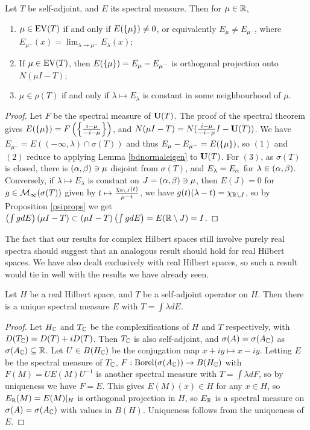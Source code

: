 \documentclass[10pt]{amsart}
\begin{document}
\begin{theorem}\label{eigenvaldecomp}
    Let $T$ be self-adjoint, and $E$ its spectral measure. Then for $\mu \in \mathbb{R}$,
    \begin{enumerate}
        \item $\mu \in \operatorname{EV}(T)$ if and only if $E(\left\{  \mu  \right\}) \neq 0$, or equivalently $E_\mu \neq E_{\mu^-}$, where $E_{\mu^-}(x) = \lim_{\lambda \to \mu^-}E_\lambda(x)$;
        \item If $\mu \in \operatorname{EV}(T)$, then $E(\left\{  \mu  \right\}) = E_\mu - E_{\mu^-}$ is orthogonal projection onto $N(\mu I - T)$;
        \item $\mu \in \rho(T)$ if and only if $\lambda \mapsto E_\lambda$ is constant in some neighbourhood of $\mu$.
    \end{enumerate}
\end{theorem}
\begin{proof}
    Let $F$ be the spectral measure of $\mathbf{U}(T)$. The proof of the spectral theorem gives $E(\left\{  \mu  \right\}) = F\left(  \left\{  \frac{i - \mu}{-i - \mu}  \right\}  \right)$, and $N(\mu I - T) = N(\frac{i - \mu}{-i - \mu}I - \mathbf{U}(T))$. We have $E_{\mu^-} = E((-\infty, \lambda) \cap \sigma(T))$ and thus $E_{\mu} - E_{\mu^-} = E(\left\{  \mu  \right\})$, so $(1)$ and $(2)$ reduce to applying Lemma \ref{bdnormaleigen} to $\mathbf{U}(T)$. For $(3)$, as $\sigma(T)$ is closed, there is $(\alpha, \beta) \ni \mu$ disjoint from $\sigma(T)$, and $E_\lambda = E_\alpha$ for $\lambda \in (\alpha, \beta)$. Conversely, if $\lambda \mapsto E_\lambda$ is constant on $J = (\alpha, \beta) \ni \mu$, then $E(J) = 0$ for $g \in \mathcal{M}_\infty(\sigma(T))$ given by $t \mapsto \frac{\chi_{\mathbb{R} \setminus J}(t)}{\mu - t}$, we have $g(t)(\lambda - t) = \chi_{\mathbb{R} \setminus J}$, so by Proposition \ref{psiprops} we get $\left(  \int g dE  \right)(\mu I - T) \subset (\mu I - T)\left(  \int g dE  \right) = E(\mathbb{R} \setminus J) = I$.
\end{proof}
The fact that our results for complex Hilbert spaces still involve purely real spectra should suggest that an analogous result should hold for real Hilbert spaces. We have also dealt exclusively with real Hilbert spaces, so such a result would tie in well with the results we have already seen.
\begin{theorem}
    Let $H$ be a real Hilbert space, and $T$ be a self-adjoint operator on $H$. Then there is a unique spectral measure $E$ with $T = \int \lambda dE$.
\end{theorem}
\begin{proof}
    Let $H_{\mathbb{C}}$ and $T_{\mathbb{C}}$ be the complexifications of $H$ and $T$ respectively, with $D(T_{\mathbb{C}}) = D(T) + iD(T)$. Then $T_{\mathbb{C}}$ is also self-adjoint, and $\sigma(A) = \sigma(A_{\mathbb{C}})$ as $\sigma(A_{\mathbb{C}}) \subseteq \mathbb{R}$. Let $U \in B(H_{\mathbb{C}})$ be the conjugation map $x + iy \mapsto x - iy$. Letting $E$ be the spectral measure of $T_{\mathbb{C}}$, $F : \operatorname{Borel}(\sigma(A_{\mathbb{C}})) \to B(H_{\mathbb{C}})$ with $F(M) = UE(M)U^{-1}$ is another spectral measure with $T = \int \lambda dF$, so by uniqueness we have $F = E$. This gives $E(M)(x) \in H$ for any $x \in H$, so $E_{\mathbb{R}}(M) = E(M)|_H$ is orthogonal projection in $H$, so $E_{\mathbb{R}}$ is a spectral measure on $\sigma(A) = \sigma(A_{\mathbb{C}})$ with values in $B(H)$. Uniqueness follows from the uniqueness of $E$.
\end{proof} %
\end{document}

